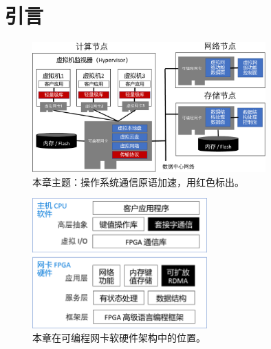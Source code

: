\section{引言}
\label{socksdirect:sec:intro}

\begin{figure}[htbp]
	\centering
	\includegraphics[width=0.8\textwidth]{images/sys_arch.pdf}
	\caption{本章主题：操作系统通信原语加速，用红色标出。}
	\label{socksdirect:fig:sys-arch}
\end{figure}

\begin{figure}[htbp]
	\centering
	\includegraphics[width=0.6\textwidth]{images/sw_hw_codesign.pdf}
	\caption{本章在可编程网卡软硬件架构中的位置。}
	\label{socksdirect:fig:sw-hw-codesign}
\end{figure}

